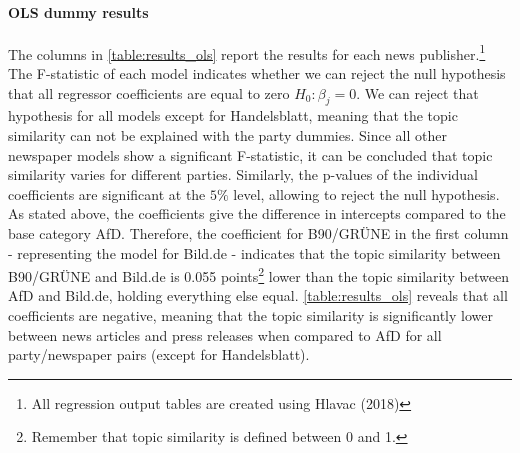 \documentclass[
  12pt,
]{article}
\begin{document}
\hypertarget{ols-dummy-results}{%
\paragraph{OLS dummy results}\label{ols-dummy-results}}

The columns in \autoref{table:results_ols} report the results for each
news publisher.\footnote{All regression output tables are created using
  Hlavac (2018)} The F-statistic of each model indicates whether we can
reject the null hypothesis that all regressor coefficients are equal to
zero \(H_0: \beta_j=0\). We can reject that hypothesis for all models
except for Handelsblatt, meaning that the topic similarity can not be
explained with the party dummies. Since all other newspaper models show
a significant F-statistic, it can be concluded that topic similarity
varies for different parties. Similarly, the p-values of the individual
coefficients are significant at the \(5\%\) level, allowing to reject
the null hypothesis. As stated above, the coefficients give the
difference in intercepts compared to the base category AfD. Therefore,
the coefficient for B90/GRÜNE in the first column - representing the
model for Bild.de - indicates that the topic similarity between
B90/GRÜNE and Bild.de is 0.055 points\footnote{Remember that topic
  similarity is defined between 0 and 1.} lower than the topic
similarity between AfD and Bild.de, holding everything else equal.
\autoref{table:results_ols} reveals that all coefficients are negative,
meaning that the topic similarity is significantly lower between news
articles and press releases when compared to AfD for all party/newspaper
pairs (except for Handelsblatt).
\end{document}
